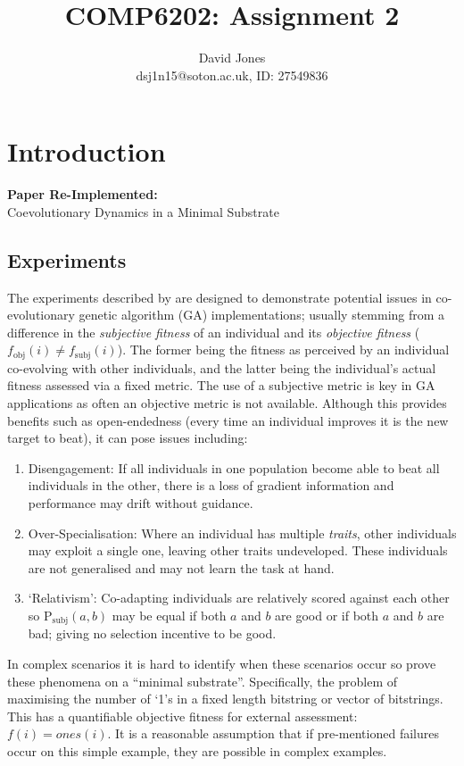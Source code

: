 \documentclass[11pt,a4paper]{article}
\title{COMP6202: Assignment 2}
\author{
David Jones \\
dsj1n15@soton.ac.uk, ID: 27549836}
\date{}
\begin{document}
\maketitle

\section{Introduction}
\textbf{Paper Re-Implemented:}\\
Coevolutionary Dynamics in a Minimal Substrate \parencite{Watson:2001}

\subsection{Experiments}
The experiments described by \cite{Watson:2001} are designed to demonstrate potential issues in co-evolutionary genetic algorithm (GA) implementations; usually stemming from a difference in the \textit{subjective fitness}  of an individual and its \textit{objective fitness} ($f_\text{obj}(i) \neq f_\text{subj}(i)$). The former being the fitness as perceived by an individual co-evolving with other individuals, and the latter being the individual's actual fitness assessed via a fixed metric. The use of a subjective metric is key in GA applications as often an objective metric is not available. Although this provides benefits such as open-endedness (every time an individual improves it is the new target to beat), it can pose issues including:
\begin{enumerate}[label=\Alph*]
    \item Disengagement: If all individuals in one population become able to beat all individuals in the other, there is a loss of gradient information and performance may drift without guidance.
    \item Over-Specialisation: Where an individual has multiple \textit{traits}, other individuals may exploit a single one, leaving other traits undeveloped. These individuals are not generalised and may not learn the task at hand.
    \item `Relativism': Co-adapting individuals are relatively scored against each other so $\text{P}_\text{subj}(a, b)$ may be equal if both $a$ and $b$ are good or if both $a$ and $b$ are bad; giving no selection incentive to be good.
\end{enumerate}
In complex scenarios it is hard to identify when these scenarios occur so \cite{Watson:2001} prove these phenomena on a ``minimal substrate''. Specifically, the problem of maximising the number of `1's in a fixed length bitstring or vector of bitstrings. This has a quantifiable objective fitness for external assessment: $f(i)=ones(i)$. It is a reasonable assumption that if pre-mentioned failures occur on this simple example, they are possible in complex examples.\\
\end{document}
